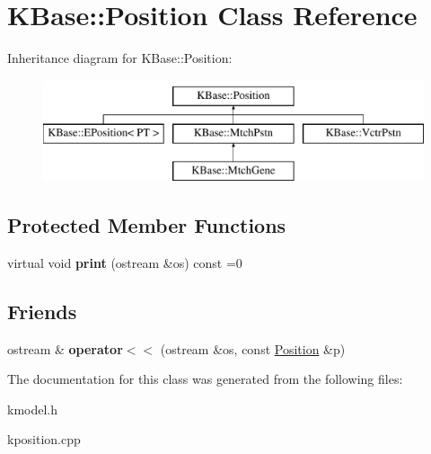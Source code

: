 \hypertarget{class_k_base_1_1_position}{\section{K\-Base\-:\-:Position Class Reference}
\label{class_k_base_1_1_position}
}
Inheritance diagram for K\-Base\-:\-:Position\-:\begin{figure}[H]
\begin{center}
\leavevmode
\includegraphics[height=3.000000cm]{class_k_base_1_1_position}
\end{center}
\end{figure}
\subsection*{Protected Member Functions}
\begin{DoxyCompactItemize}
\item 
\hypertarget{class_k_base_1_1_position_a4ae09e7209a5d0caeb51f1c977a21824}{virtual void {\bfseries print} (ostream \&os) const =0}\label{class_k_base_1_1_position_a4ae09e7209a5d0caeb51f1c977a21824}

\end{DoxyCompactItemize}
\subsection*{Friends}
\begin{DoxyCompactItemize}
\item 
\hypertarget{class_k_base_1_1_position_ab7b251ca32003b3e085beb58f406e9ce}{ostream \& {\bfseries operator$<$$<$} (ostream \&os, const \hyperlink{class_k_base_1_1_position}{Position} \&p)}\label{class_k_base_1_1_position_ab7b251ca32003b3e085beb58f406e9ce}

\end{DoxyCompactItemize}


The documentation for this class was generated from the following files\-:\begin{DoxyCompactItemize}
\item 
kmodel.\-h\item 
kposition.\-cpp\end{DoxyCompactItemize}
